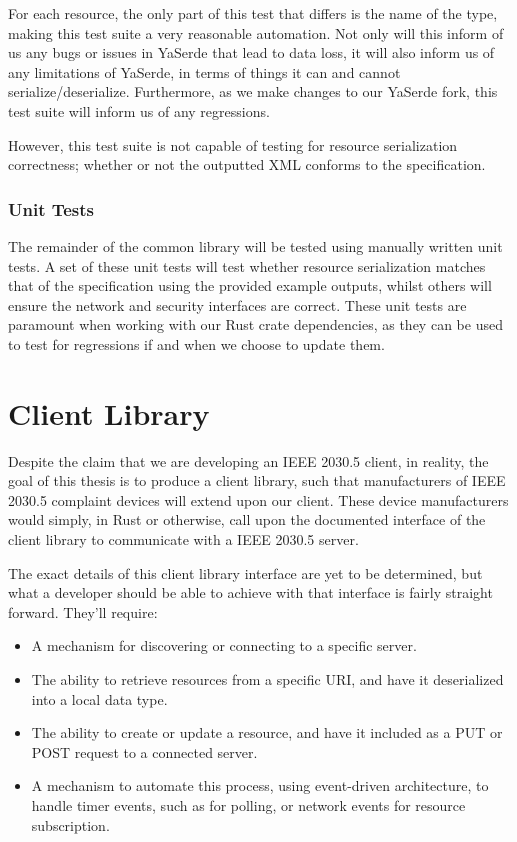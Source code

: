 For each resource, the only part of this test that differs is the name of the type, making this test suite a very reasonable automation.
Not only will this inform of us any bugs or issues in YaSerde that lead to data loss, it will also inform us of any limitations of YaSerde, in terms of things it can and cannot serialize/deserialize.
Furthermore, as we make changes to our YaSerde fork, this test suite will inform us of any regressions.

However, this test suite is not capable of testing for resource serialization correctness; whether or not the outputted XML conforms to the specification. 

\subsubsection{Unit Tests}
The remainder of the common library will be tested using manually written unit tests.
A set of these unit tests will test whether resource serialization matches that of the specification using the provided example outputs, whilst others will ensure the network and security interfaces are correct.
These unit tests are paramount when working with our Rust crate dependencies, as they can be used to test for regressions if and when we choose to update them.

\section{Client Library}
Despite the claim that we are developing an IEEE 2030.5 client, in reality, the goal of this thesis is to produce a client library, such that manufacturers of IEEE 2030.5 complaint devices will extend upon our client.
These device manufacturers would simply, in Rust or otherwise, call upon the documented interface of the client library to communicate with a IEEE 2030.5 server.

The exact details of this client library interface are yet to be determined, but what a developer should be able to achieve with that interface is fairly straight forward. They'll require:

\begin{itemize}
    \item A mechanism for discovering or connecting to a specific server.
    \item The ability to retrieve resources from a specific URI, and have it deserialized into a local data type.
    \item The ability to create or update a resource, and have it included as a PUT or POST request to a connected server.
    \item A mechanism to automate this process, using event-driven architecture, to handle timer events, such as for polling, or network events for resource subscription.
\end{itemize}

